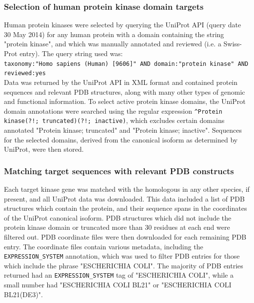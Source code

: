 \documentclass[phd,tocprelim]{cornell}
\begin{document}
\subsubsection{Selection of human protein kinase domain targets}

Human protein kinases were selected by querying the UniProt API (query date 30 May 2014) for any human protein with a domain containing the string "protein kinase", and which was manually annotated and reviewed (i.e. a Swiss-Prot entry).
The query string used was:\\
{\tt taxonomy:"Homo sapiens (Human) [9606]" AND domain:"protein kinase" AND reviewed:yes}\\
Data was returned by the UniProt API in XML format and contained protein sequences and relevant PDB structures, along with many other types of genomic and functional information.
To select active protein kinase domains, the UniProt domain annotations were searched using the regular expression {\tt \^{}Protein kinase(?!; truncated)(?!; inactive)}, which excludes certain domains annotated "Protein kinase; truncated" and "Protein kinase; inactive".
Sequences for the selected domains, derived from the canonical isoform as determined by UniProt, were then stored.


\subsubsection{Matching target sequences with relevant PDB constructs}

Each target kinase gene was matched with the homologous in any other species, if present, and all UniProt data was downloaded.
This data included a list of PDB structures which contain the protein, and their sequence spans in the coordinates of the UniProt canonical isoform. PDB structures which did not include the protein kinase domain or truncated more than 30 residues at each end were filtered out. PDB coordinate files were then downloaded for each remaining PDB entry. The coordinate files contain various metadata, including the {\tt EXPRESSION\_SYSTEM} annotation, which was used to filter PDB entries for those which include the phrase "ESCHERICHIA COLI". The majority of PDB entries returned had an {\tt EXPRESSION\_SYSTEM} tag of "ESCHERICHIA COLI", while a small number had "ESCHERICHIA COLI BL21" or "ESCHERICHIA COLI BL21(DE3)".
\end{document}
